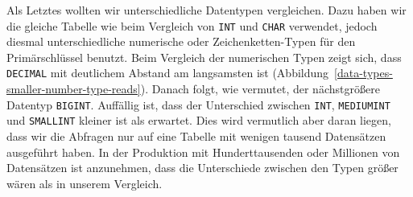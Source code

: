 Als Letztes wollten wir unterschiedliche Datentypen vergleichen.
Dazu haben wir die gleiche Tabelle wie beim Vergleich von \texttt{INT} und \texttt{CHAR} verwendet, jedoch diesmal unterschiedliche numerische oder Zeichenketten-Typen für den Primärschlüssel benutzt.
Beim Vergleich der numerischen Typen zeigt sich, dass \texttt{DECIMAL} mit deutlichem Abstand am langsamsten ist (Abbildung~\ref{data-types-smaller-number-type-reads}).
Danach folgt, wie vermutet, der nächstgrößere Datentyp \texttt{BIGINT}.
Auffällig ist, dass der Unterschied zwischen \texttt{INT}, \texttt{MEDIUMINT} und \texttt{SMALLINT} kleiner ist als erwartet.
Dies wird vermutlich aber daran liegen, dass wir die Abfragen nur auf eine Tabelle mit wenigen tausend Datensätzen ausgeführt haben.
In der Produktion mit Hunderttausenden oder Millionen von Datensätzen ist anzunehmen, dass die Unterschiede zwischen den Typen größer wären als in unserem Vergleich.

